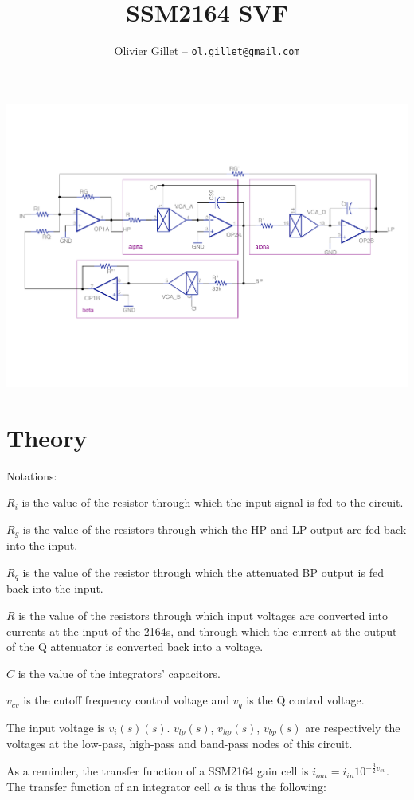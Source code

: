 \documentclass[a4paper,11pt]{article}
\title{SSM2164 SVF}
\author{Olivier Gillet -- \tt ol.gillet@gmail.com}
\date{}
\begin{document}
\maketitle

\includegraphics[width=\textwidth]{svf_schematics.pdf}

\section{Theory}

Notations:

$R_i$ is the value of the resistor through which the input signal is fed to the circuit.

$R_g$ is the value of the resistors through which the HP and LP output are fed back into the input.

$R_q$ is the value of the resistor through which the attenuated BP output is fed back into the input.

$R$ is the value of the resistors through which input voltages are converted into currents at the input of the 2164s, and through which the current at the output of the Q attenuator is converted back into a voltage.

$C$ is the value of the integrators' capacitors.

$v_{cv}$ is the cutoff frequency control voltage and $v_{q}$ is the Q control voltage.


The input voltage is $v_i(s)(s)$. $v_{lp}(s)$, $v_{hp}(s)$, $v_{bp}(s)$ are respectively the voltages at the low-pass, high-pass and band-pass nodes of this circuit.

As a reminder, the transfer function of a SSM2164 gain cell is $i_{out} = i_{in} 10^{-\frac{3}{2} v_{cv}}$. The transfer function of an integrator cell $\alpha$ is thus the following:
\end{document}
